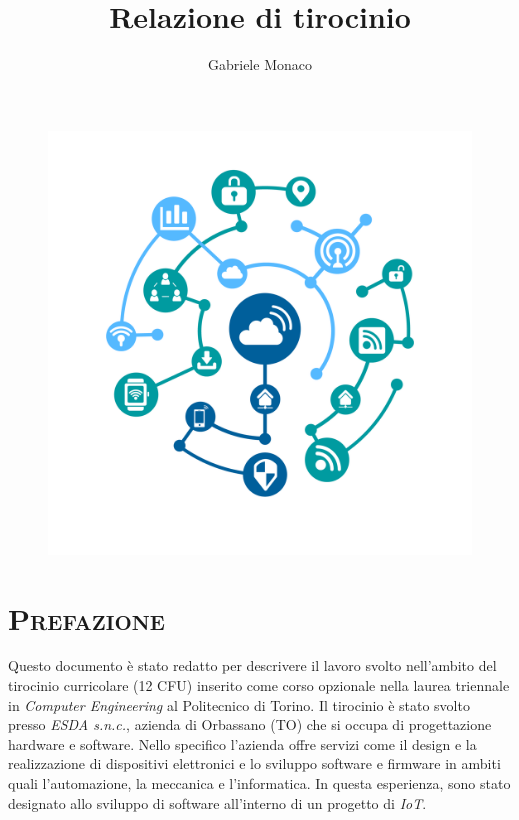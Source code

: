 \documentclass[a4paper,12pt]{article}
\title{\textbf{Relazione di tirocinio}}
\author{Gabriele Monaco}
\begin{document}
\pagestyle{fancy}
\fancyhf{}
\lhead{\thetitle}
\rhead{\theauthor}
\cfoot{\thepage}


\maketitle

\begin{figure}[h]
  \includegraphics[width=\textwidth]{header}
\end{figure}

\thispagestyle{first}

\newpage

\tableofcontents

\newpage

\setlength{\emergencystretch}{15pt}
\setlength{\parindent}{0pt}
\renewcommand{\headrulewidth}{1sp}

\section{\textsc{Prefazione}}

Questo documento \`e stato redatto per descrivere il lavoro svolto nell'ambito del tirocinio curricolare (12 CFU) inserito come corso opzionale nella laurea triennale in \textit{Computer Engineering} al Politecnico di Torino. Il tirocinio \`e stato svolto presso \textit{ESDA s.n.c.}, azienda di Orbassano (TO) che si occupa di progettazione hardware e software. Nello specifico l'azienda offre servizi come il design e la realizzazione di dispositivi elettronici e lo sviluppo software e firmware in ambiti quali l'automazione, la meccanica e l'informatica. In questa esperienza, sono stato designato allo sviluppo di software all'interno di un progetto di \textit{IoT}.
\end{document}

